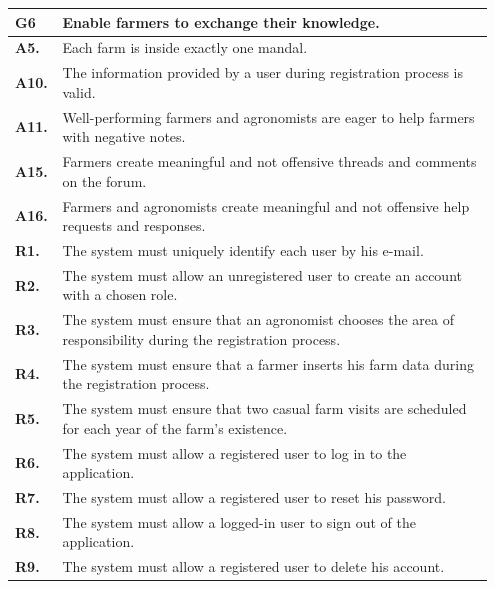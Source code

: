 \begin{longtable}{p{0.07\linewidth} p{0.88\linewidth}} 
    \toprule
    \textbf{G6} & Enable farmers to exchange their knowledge. \\ 
    \midrule
    \textbf{A5.} & Each farm is inside exactly one mandal.\\ 
    \textbf{A10.} & The information provided by a user during registration process is valid.\\ 
    \textbf{A11.} & Well-performing farmers and agronomists are eager to help farmers with negative notes.\\ 
    \textbf{A15.} & Farmers create meaningful and not offensive threads and comments on the forum.\\ 
    \textbf{A16.} & Farmers and agronomists create meaningful and not offensive help requests and responses. \\
    \midrule
    
	\textbf{R1.} & The system must uniquely identify each user by his e-mail. \\
	\textbf{R2.} & The system must allow an unregistered user to create an account with a chosen role. \\
	\textbf{R3.} & The system must ensure that an agronomist chooses the area of responsibility during the registration process. \\
	\textbf{R4.} & The system must ensure that a farmer inserts his farm data during the registration process.\\
	\textbf{R5.} & The system must ensure that two casual farm visits are scheduled for each year of the farm's existence.\\
	\textbf{R6.} & The system must allow a registered user to log in to the application. \\
	\textbf{R7.} & The system must allow a registered user to reset his password. \\
	\textbf{R8.} & The system must allow a logged-in user to sign out of the application. \\
	\textbf{R9.} & The system must allow a registered user to delete his account. \\
	

\end{longtable}

